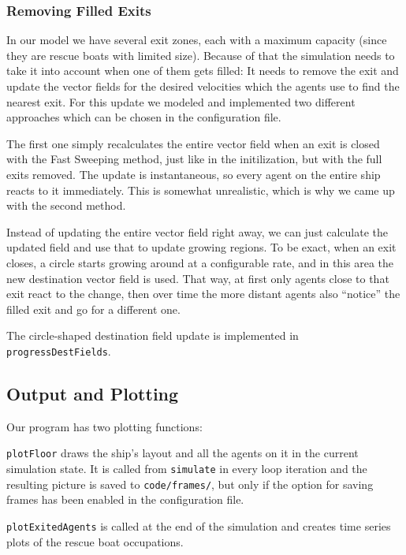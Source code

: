 \documentclass[11pt]{article}
\begin{document}
\subsubsection{Removing Filled Exits}
\label{sub:exitremove}

In our model we have several exit zones, each with a maximum capacity (since
they are rescue boats with limited size).  Because of that the simulation needs
to take it into account when one of them gets filled: It needs to remove the
exit and update the vector fields for the desired velocities which the agents
use to find the nearest exit.  For this update we modeled and implemented two
different approaches which can be chosen in the configuration file.

The first one simply recalculates the entire vector field when an exit is
closed with the Fast Sweeping method, just like in the initilization, but with
the full exits removed.  The update is instantaneous, so every agent on the
entire ship reacts to it immediately.  This is somewhat unrealistic, which is
why we came up with the second method.

Instead of updating the entire vector field right away, we can just calculate
the updated field and use that to update growing regions.  To be exact, when an
exit closes, a circle starts growing around at a configurable rate, and in this
area the new destination vector field is used.  That way, at first only agents
close to that exit react to the change, then over time the more distant agents
also ``notice'' the filled exit and go for a different one.

The circle-shaped destination field update is implemented in
\texttt{progressDestFields}.

\subsection{Output and Plotting}
\label{sub:output}

Our program has two plotting functions:

\texttt{plotFloor} draws the ship's layout and all the agents on it in the
current simulation state.  It is called from \texttt{simulate} in every loop
iteration and the resulting picture is saved to \texttt{code/frames/}, but only
if the option for saving frames has been enabled in the configuration file.

\texttt{plotExitedAgents} is called at the end of the simulation and creates
time series plots of the rescue boat occupations.
\end{document}
